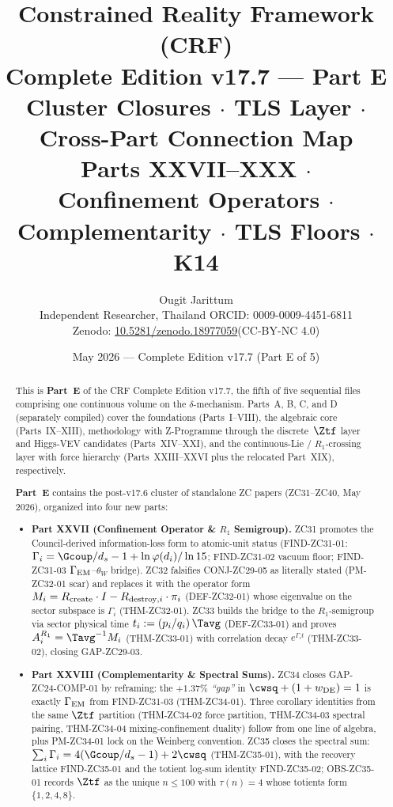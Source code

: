 \documentclass[12pt, a4paper]{article}
\title{%
  \textbf{\color{deepblue}Constrained Reality Framework (CRF)}\\[0.4em]
  \large Complete Edition v17.7 --- Part E\\
  \large Cluster Closures $\cdot$ TLS Layer $\cdot$ Cross-Part Connection Map\\[0.3em]
  \normalsize\color{mutedgray}
  Parts XXVII--XXX $\cdot$\\
  Confinement Operators $\cdot$ Complementarity $\cdot$ TLS Floors $\cdot$ K14
}
\author{Ougit Jarittum\\
\small Independent Researcher, Thailand\quad
ORCID: 0009-0009-4451-6811\\
\small Zenodo: \href{https://doi.org/10.5281/zenodo.18977059}{10.5281/zenodo.18977059}\quad (CC-BY-NC 4.0)
}
\date{May 2026 --- Complete Edition v17.7 (Part E of 5)}
\begin{document}

\maketitle

\begin{abstract}
\sloppy
This is \textbf{Part~E} of the CRF Complete Edition v17.7, the fifth
of five sequential files comprising one continuous volume on the
$\delta$-mechanism. Parts~A, B, C, and D (separately compiled) cover
the foundations (Parts~I--VIII), the algebraic core (Parts~IX--XIII),
methodology with Z-Programme through the discrete~$\Ztf$ layer and
Higgs-VEV candidates (Parts~XIV--XXI), and the continuous-Lie /
$R_1$-crossing layer with force hierarchy (Parts~XXIII--XXVI plus
the relocated Part~XIX), respectively.

\textbf{Part~E} contains the post-v17.6 cluster of standalone ZC papers
(ZC31--ZC40, May 2026), organized into four new parts:

\begin{itemize}[leftmargin=2em]
\item \textbf{Part XXVII (Confinement Operator \& $R_1$ Semigroup).}
ZC31 promotes the Council-derived information-loss form to atomic-unit
status (FIND-ZC31-01: $\Gamma_i = \Gcoup/d_s - 1 + \ln\varphi(d_i)/\ln 15$;
FIND-ZC31-02 vacuum floor; FIND-ZC31-03 $\Gamma_{\rm EM}$--$\theta_W$
bridge). ZC32 falsifies CONJ-ZC29-05 as literally stated (PM-ZC32-01
scar) and replaces it with the operator form
$M_i = R_{\rm create}\cdot I - R_{{\rm destroy},i}\cdot\pi_i$
(DEF-ZC32-01) whose eigenvalue on the sector subspace is $\Gamma_i$
(THM-ZC32-01). ZC33 builds the bridge to the $R_1$-semigroup via
sector physical time $t_i := (p_i/q_i)\,\Tavg$ (DEF-ZC33-01) and
proves $A_i^{R_1} = \Tavg^{-1} M_i$ (THM-ZC33-01) with correlation
decay $e^{\Gamma_i t}$ (THM-ZC33-02), closing GAP-ZC29-03.

\item \textbf{Part XXVIII (Complementarity \& Spectral Sums).}
ZC34 closes GAP-ZC24-COMP-01 by reframing: the
\emph{$+1.37\%$ ``gap''} in $\cwsq + (1+w_{\rm DE}) = 1$ is exactly
$\Gamma_{\rm EM}$ from FIND-ZC31-03 (THM-ZC34-01). Three corollary
identities from the same $\Ztf$ partition (THM-ZC34-02 force partition,
THM-ZC34-03 spectral pairing, THM-ZC34-04 mixing-confinement duality)
follow from one line of algebra, plus PM-ZC34-01 lock on the Weinberg
convention. ZC35 closes the spectral sum:
$\sum_i \Gamma_i = 4(\Gcoup/d_s - 1) + 2\cwsq$ (THM-ZC35-01), with the
recovery lattice FIND-ZC35-01 and the totient log-sum identity
FIND-ZC35-02; OBS-ZC35-01 records $\Ztf$ as the unique $n\le 100$ with
$\tau(n)=4$ whose totients form $\{1,2,4,8\}$.


\end{itemize}
\end{abstract}
\end{document}
